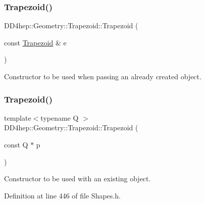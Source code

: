 \subsubsection{\texorpdfstring{Trapezoid()}{Trapezoid()}\hspace{0.1cm}{\footnotesize\ttfamily [2/6]}}
{\footnotesize\ttfamily D\+D4hep\+::\+Geometry\+::\+Trapezoid\+::\+Trapezoid (\begin{DoxyParamCaption}\item[{const \hyperlink{class_d_d4hep_1_1_geometry_1_1_trapezoid}{Trapezoid} \&}]{e }\end{DoxyParamCaption})\hspace{0.3cm}{\ttfamily [default]}}



Constructor to be used when passing an already created object. 

\hypertarget{class_d_d4hep_1_1_geometry_1_1_trapezoid_a257a1d8f82d51fdd31be2190ae57b20a}{}\label{class_d_d4hep_1_1_geometry_1_1_trapezoid_a257a1d8f82d51fdd31be2190ae57b20a} 
\subsubsection{\texorpdfstring{Trapezoid()}{Trapezoid()}\hspace{0.1cm}{\footnotesize\ttfamily [3/6]}}
{\footnotesize\ttfamily template$<$typename Q $>$ \\
D\+D4hep\+::\+Geometry\+::\+Trapezoid\+::\+Trapezoid (\begin{DoxyParamCaption}\item[{const Q $\ast$}]{p }\end{DoxyParamCaption})\hspace{0.3cm}{\ttfamily [inline]}}



Constructor to be used with an existing object. 



Definition at line 446 of file Shapes.\+h.

\hypertarget{class_d_d4hep_1_1_geometry_1_1_trapezoid_a4d6d48925139c1e92002ffebedc9cd5c}{}\label{class_d_d4hep_1_1_geometry_1_1_trapezoid_a4d6d48925139c1e92002ffebedc9cd5c} 

